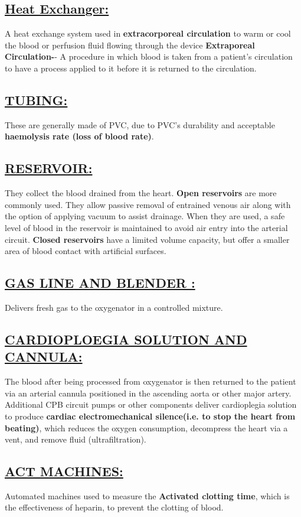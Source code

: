 \documentclass[12pt]{article}
\begin{document}
\subsection{\underline{Heat Exchanger:}}
A heat exchange system used in \textbf{extracorporeal circulation} to warm or cool the blood or perfusion fluid flowing through the device
\newline \textbf{Extraporeal Circulation-}- A procedure in which blood is taken from a patient's circulation to have a process applied to it before it is returned to the circulation.
\subsection{\underline{TUBING:}}
These are generally made of PVC, due to PVC's durability and acceptable \textbf{haemolysis rate (loss of blood rate)}.
\subsection{\underline{RESERVOIR:}}
They collect the blood drained from the heart. \textbf{Open reservoirs} are more commonly used. They allow passive removal of entrained venous air along with the option of applying vacuum to assist drainage. When they are used, a safe level of blood in the reservoir is maintained to avoid air entry into the arterial circuit. \textbf{Closed reservoirs} have a limited volume capacity, but offer a smaller area of blood contact with artificial surfaces.
\subsection{\underline{GAS LINE AND BLENDER :}}
Delivers fresh gas to the oxygenator in a controlled mixture.
\subsection{\underline{CARDIOPLOEGIA SOLUTION AND CANNULA:}}
The blood after being processed from oxygenator is then returned to the patient via an arterial cannula positioned in the ascending aorta or other major artery.
Additional CPB circuit pumps or other components deliver cardioplegia solution to produce \textbf{cardiac electromechanical silence(i.e. to stop the heart from beating)}, which reduces the oxygen consumption, decompress the heart via a vent, and remove fluid (ultrafiltration).
\subsection {\underline{ACT MACHINES:}}
Automated machines used to measure the \textbf{Activated clotting time}, which is the effectiveness of heparin, to prevent the clotting of blood.
\end{document}
